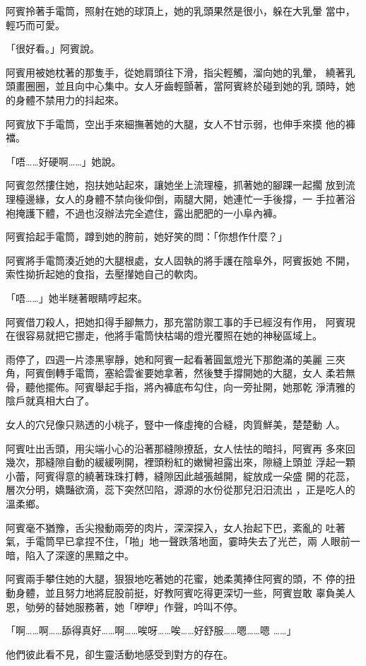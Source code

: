 阿賓拎著手電筒，照射在她的球頂上，她的乳頭果然是很小，躲在大乳暈
當中，輕巧而可愛。

「很好看。」阿賓說。

阿賓用被她枕著的那隻手，從她肩頭往下滑，指尖輕觸，溜向她的乳暈，
繞著乳頭畫圈圈，並且向中心集中。女人牙齒輕顫著，當阿賓終於碰到她的乳
頭時，她的身體不禁用力的抖起來。

阿賓放下手電筒，空出手來細撫著她的大腿，女人不甘示弱，也伸手來摸
他的褲襠。

「唔……好硬啊……」她說。

阿賓忽然摟住她，抱扶她站起來，讓她坐上流理檯，抓著她的腳踝一起擱
放到流理檯邊緣，女人的身體不禁向後仰倒，兩腿大開，她連忙一手後撐，一
手拉著浴袍掩護下體，不過也沒辦法完全遮住，露出肥肥的一小阜內褲。

阿賓拾起手電筒，蹲到她的胯前，她好笑的問：「你想作什麼？」

阿賓將手電筒湊近她的大腿根處，女人固執的將手護在陰阜外，阿賓扳她
不開，索性拗折起她的食指，去壓攆她自己的軟肉。

「唔……」她半瞇著眼睛哼起來。

阿賓借刀殺人，把她扣得手腳無力，那充當防禦工事的手已經沒有作用，
阿賓現在很容易就把它挪走，他將手電筒快枯竭的燈光覆照在她的神秘區域上。

雨停了，四週一片漆黑寧靜，她和阿賓一起看著圓氳燈光下那飽滿的美麗
三夾角，阿賓倒轉手電筒，塞給雲雀要她拿著，然後雙手撐開她的大腿，女人
柔若無骨，聽他擺佈。阿賓舉起手指，將內褲底布勾住，向一旁扯開，她那乾
淨清雅的陰戶就真相大白了。

女人的穴兒像只熟透的小桃子，豎中一條虛掩的合縫，肉質鮮美，楚楚動
人。

阿賓吐出舌頭，用尖端小心的沿著那縫隙撩舐，女人怯怯的暗抖，阿賓再
多來回幾次，那縫隙自動的緩緩咧開，裡頭粉紅的嫩臠袒露出來，隙縫上頭並
浮起一顆小蕾，阿賓得意的繞著珠珠打轉，縫隙因此越張越開，綻放成一朵盛
開的花蕊，層次分明，嬌豔欲滴，蕊下突然凹陷，源源的水份從那兒汨汨流出
，正是吃人的溫柔鄉。

阿賓毫不猶豫，舌尖撥動兩旁的肉片，深深探入，女人抬起下巴，紊亂的
吐著氣，手電筒早已拿捏不住，「啪」地一聲跌落地面，霎時失去了光芒，兩
人眼前一暗，陷入了深邃的黑黯之中。

阿賓兩手攀住她的大腿，狠狠地吃著她的花蜜，她柔荑捧住阿賓的頭，不
停的扭動身體，並且努力地將屁股前挺，好教阿賓吃得更深切一些，阿賓豈敢
辜負美人恩，劬勞的替她服務著，她「咿咿」作聲，吟叫不停。

「啊……啊……舔得真好……啊……唉呀……唉……好舒服……嗯……嗯
……」

他們彼此看不見，卻生靈活動地感受到對方的存在。

